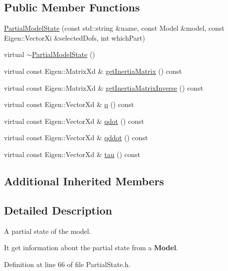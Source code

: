 \subsection*{Public Member Functions}
\begin{DoxyCompactItemize}
\item 
\hyperlink{classocra_1_1PartialModelState_aad632d12d35f5982df12d949f92d4937}{Partial\+Model\+State} (const std\+::string \&name, const Model \&model, const Eigen\+::\+Vector\+Xi \&selected\+Dofs, int which\+Part)
\item 
virtual \hyperlink{classocra_1_1PartialModelState_a59cf8faac5922dc7691c540d519fa705}{$\sim$\+Partial\+Model\+State} ()
\item 
virtual const Eigen\+::\+Matrix\+Xd \& \hyperlink{classocra_1_1PartialModelState_a9fe03ab8c3c4afe56ee4b59f96ac4a25}{get\+Inertia\+Matrix} () const
\item 
virtual const Eigen\+::\+Matrix\+Xd \& \hyperlink{classocra_1_1PartialModelState_a664e4f70861eefde844dca6dd09a2213}{get\+Inertia\+Matrix\+Inverse} () const
\item 
virtual const Eigen\+::\+Vector\+Xd \& \hyperlink{classocra_1_1PartialModelState_ac50f637a2ce55608b4159b7dac2c543d}{q} () const
\item 
virtual const Eigen\+::\+Vector\+Xd \& \hyperlink{classocra_1_1PartialModelState_a8707827d456a8c406d95c1cd4fc2e0b7}{qdot} () const
\item 
virtual const Eigen\+::\+Vector\+Xd \& \hyperlink{classocra_1_1PartialModelState_a9be011bf4005c0b964f857a82b2b2b23}{qddot} () const
\item 
virtual const Eigen\+::\+Vector\+Xd \& \hyperlink{classocra_1_1PartialModelState_a286258284aa61c902106a6b0fcdde9ca}{tau} () const
\end{DoxyCompactItemize}
\subsection*{Additional Inherited Members}


\subsection{Detailed Description}
A partial state of the model. 

It get information about the partial state from a {\bfseries Model}. 

Definition at line 66 of file Partial\+State.\+h.



